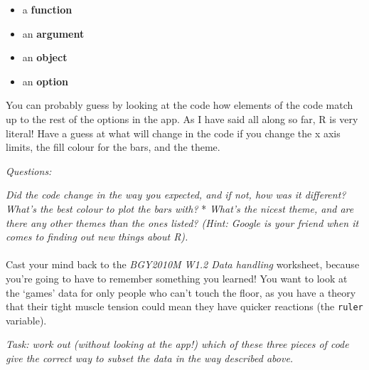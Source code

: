 \documentclass[
]{book}
\newenvironment{Shaded}{\begin{snugshade}}{\end{snugshade}}
\newcommand{\CommentTok}[1]{\textcolor[rgb]{0.56,0.35,0.01}{\textit{#1}}}
\newcommand{\DecValTok}[1]{\textcolor[rgb]{0.00,0.00,0.81}{#1}}
\newcommand{\KeywordTok}[1]{\textcolor[rgb]{0.13,0.29,0.53}{\textbf{#1}}}
\newcommand{\NormalTok}[1]{#1}
\newcommand{\OperatorTok}[1]{\textcolor[rgb]{0.81,0.36,0.00}{\textbf{#1}}}
\newcommand{\StringTok}[1]{\textcolor[rgb]{0.31,0.60,0.02}{#1}}
\providecommand{\tightlist}{%
  \setlength{\itemsep}{0pt}\setlength{\parskip}{0pt}}
\begin{document}
\begin{itemize}
\tightlist
\item
  a \textbf{function}
\item
  an \textbf{argument}
\item
  an \textbf{object}
\item
  an \textbf{option}\\
\end{itemize}

You can probably guess by looking at the code how elements of the code match up to the rest of the options in the app.
As I have said all along so far, R is very literal! Have a guess at what
will change in the code if you change the x axis limits, the fill colour for
the bars, and the theme.

\emph{Questions:}

\emph{\emph{Did the code change in the way you expected, and if not, how was it different? }
} \emph{What's the best colour to plot the bars with? }
* \emph{What's the nicest theme, and are there any other themes than the ones listed?
(Hint: Google is your friend when it comes to finding out new things about R).}\\
~\\

Cast your mind back to the \emph{BGY2010M W1.2 Data handling} worksheet, because
you're going to have to remember something you learned! You want to look
at the `games' data for only people who can't touch the floor, as you have a theory
that their tight muscle tension could mean they have quicker reactions
(the \texttt{ruler} variable).

\emph{Task: work out (without looking at the app!) which of these three pieces of code
give the correct way to subset the data in the way described above.}

\begin{Shaded}
\end{Shaded}
\end{document}
